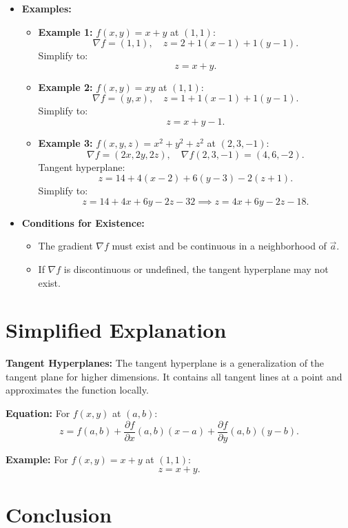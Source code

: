 \documentclass{article}
\begin{document}
\begin{itemize}
  \item \textbf{Examples:}
    \begin{itemize}
      \item \textbf{Example 1:} $f(x, y) = x + y$ at $(1, 1)$:
        \[
          \nabla f = (1, 1), \quad z = 2 + 1(x - 1) + 1(y - 1).
        \]
        Simplify to:
        \[
          z = x + y.
        \]

      \item \textbf{Example 2:} $f(x, y) = xy$ at $(1, 1)$:
        \[
          \nabla f = (y, x), \quad z = 1 + 1(x - 1) + 1(y - 1).
        \]
        Simplify to:
        \[
          z = x + y - 1.
        \]

      \item \textbf{Example 3:} $f(x, y, z) = x^2 + y^2 + z^2$ at $(2, 3, -1)$:
        \[
          \nabla f = (2x, 2y, 2z), \quad \nabla f(2, 3, -1) = (4, 6, -2).
        \]
        Tangent hyperplane:
        \[
          z = 14 + 4(x - 2) + 6(y - 3) - 2(z + 1).
        \]
        Simplify to:
        \[
          z = 14 + 4x + 6y - 2z - 32 \implies z = 4x + 6y - 2z - 18.
        \]
    \end{itemize}

  \item \textbf{Conditions for Existence:}
    \begin{itemize}
      \item The gradient $\nabla f$ must exist and be continuous in a neighborhood of $\vec{a}$.
      \item If $\nabla f$ is discontinuous or undefined, the tangent hyperplane may not exist.
    \end{itemize}
\end{itemize}

\section*{Simplified Explanation}

\textbf{Tangent Hyperplanes:}
The tangent hyperplane is a generalization of the tangent plane for higher dimensions. It contains all tangent lines at a point and approximates the function locally.

\textbf{Equation:}
For $f(x, y)$ at $(a, b)$:
\[
  z = f(a, b) + \frac{\partial f}{\partial x}(a, b)(x - a) + \frac{\partial f}{\partial y}(a, b)(y - b).
\]

\textbf{Example:}
For $f(x, y) = x + y$ at $(1, 1)$:
\[
  z = x + y.
\]

\section*{Conclusion}
\end{document}
